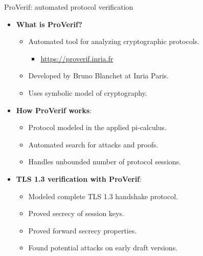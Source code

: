 \ifdefined\PRESENTATION\else\PassOptionsToClass{handout}{beamer}\fi\documentclass[aspectratio=169, lualatex]{beamer}
\begin{document}
\begin{frame}{ProVerif: automated protocol verification}
	\begin{itemize}
		\item \textbf{What is ProVerif?}
		      \begin{itemize}
			      \item Automated tool for analyzing cryptographic protocols.
			            \begin{itemize}
				            \item \url{https://proverif.inria.fr}
			            \end{itemize}
			      \item Developed by Bruno Blanchet at Inria Paris.
			      \item Uses symbolic model of cryptography.
		      \end{itemize}
		\item \textbf{How ProVerif works}:
		      \begin{itemize}
			      \item Protocol modeled in the applied pi-calculus.
			      \item Automated search for attacks and proofs.
			      \item Handles unbounded number of protocol sessions.
		      \end{itemize}
		\item \textbf{TLS 1.3 verification with ProVerif}:
		      \begin{itemize}
			      \item Modeled complete TLS 1.3 handshake protocol.
			      \item Proved secrecy of session keys.
			      \item Proved forward secrecy properties.
			      \item Found potential attacks on early draft versions.
		      \end{itemize}
	\end{itemize}
\end{frame}
\end{document}
